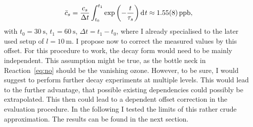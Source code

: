\begin{align}
  \bar c_s = \frac{c_s}{\Delta t} \int_{t_0}^{t_1}
  \exp\left(-\frac{t}{\tau_s}\right)\d[t] \approx \SI{1.55(8)}{ppb},\label{eq:offset}
\end{align}
with $t_0 = \SI{30}{\second}$, $t_1 = \SI{60}{\second}$,
$\Delta t = t_1 - t_0$, where I already specialised to the later used
setup of $l = \SI{10}{\meter}$. I propose now to correct the measured
 values by this offset. For this procedure to work, the decay
form would need to be mainly  independent. This assumption
might be true, as the bottle neck in Reaction~\eqref{eq:no} should be
the vanishing ozone. However, to be sure, I would suggest to perform
further decay experiments at multiple  levels. This would lead
to the further advantage, that possible existing  dependencies
could possibly be extrapolated. This then could lead to a 
dependent offset correction in the evaluation procedure.  In the
following I tested the limits of this rather crude approximation. The
results can be found in the next section.

